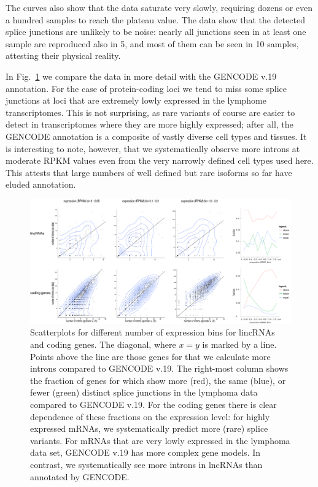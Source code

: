 \documentclass[ncrna,article,submit,moreauthors,pdftex,10pt,a4paper]{mdpi}
\begin{document}
The curves also show that the data saturate very slowly, requiring dozens
or even a hundred samples to reach the plateau value. The data show that
the detected splice junctions are unlikely to be noise: nearly all
junctions seen in at least one sample are reproduced also in 5, and most of
them can be seen in 10 samples, attesting their physical reality.

In Fig.~\ref{fig:compare} we compare the data in more detail with the
GENCODE v.19 annotation. For the case of protein-coding loci we tend to
miss some splice junctions at loci that are extremely lowly expressed in
the lymphome transcriptomes. This is not surprising, as rare variants of
course are easier to detect in transcriptomes where they are more highly
expressed; after all, the GENCODE annotation is a composite of vastly
diverse cell types and tissues. It is interesting to note, however, that we
systematically observe more introns at moderate RPKM values even from the
very narrowly defined cell types used here. This attests that large numbers
of well defined but rare isoforms so far have eluded annotation.

\begin{figure}[t]
  \begin{center}
    \includegraphics[width=\textwidth]{Fig1}
  \end{center}
  \caption{Scatterplots for different number of expression bins for
    lincRNAs and coding genes.  The diagonal, where $x=y$ is marked by a
    line. Points above the line are those genes for that we calculate more
    introns compared to GENCODE v.19.  The right-most column shows the
    fraction of genes for which show more (red), the same (blue), or fewer
    (green) distinct splice junctions in the lymphoma data compared to
    GENCODE v.19.  For the coding genes there is clear dependence of these
    fractions on the expression level: for highly expressed mRNAs, we
    systematically predict more (rare) splice variants. For mRNAs that are
    very lowly expressed in the lymphoma data set, GENCODE v.19 has more
    complex gene models. In contrast, we systematically see more introns in
    lncRNAs than annotated by GENCODE.}
  \label{fig:compare}
\end{figure}
\end{document}

